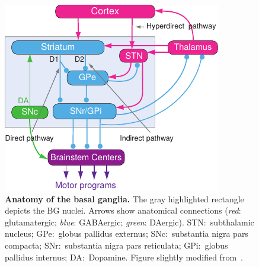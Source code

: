 \begin{figure}[bth]
	\begin{center}
		\includegraphics[width=0.7\linewidth]{ch-intro/figures/BGAnatomy}
		\caption[Anatomy of the Basal Ganglia]
		{\textbf{Anatomy of the basal ganglia.}
		The gray highlighted rectangle depicts the BG nuclei.
		Arrows show anatomical connections (\textit{red}: glutamatergic; \textit{blue}: GABAergic; \textit{green}: DAergic).
		STN:~subthalamic nucleus;
		GPe:~globus pallidus externus;
		SNc:~substantia nigra pars compacta;
		SNr:~substantia nigra pars reticulata;
		GPi:~globus pallidus internus;
		DA:~Dopamine.
		Figure slightly modified from~\cite{Grillner2016BG}.
		}
		\label{fig:intro:BGAnatomy}
	\end{center}
\end{figure}